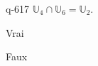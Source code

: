 \begin{truefalse}{q-617}
$\mathbb U_4 \cap  \mathbb U_6=\mathbb U_2$.
\item* Vrai
\item Faux
\end{truefalse}

